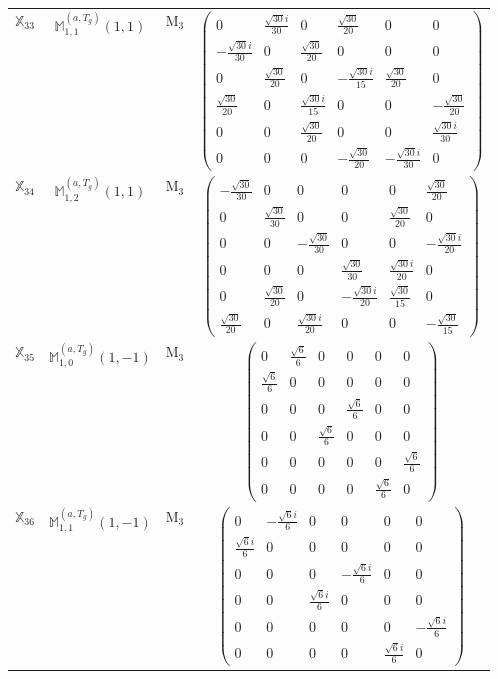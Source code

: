 \documentclass[fleqn,10pt,landscape]{article}
\begin{document}
\begin{itemize}
\begin{center}
\begin{longtable}{c|c|c|c}
$ \mathbb{X}_{33} $ & $\mathbb{M}_{1,1}^{(a,T_{g})}(1,1)$ & M$_{3}$ & $\begin{pmatrix} 0 & \frac{\sqrt{30} i}{30} & 0 & \frac{\sqrt{30}}{20} & 0 & 0 \\ - \frac{\sqrt{30} i}{30} & 0 & \frac{\sqrt{30}}{20} & 0 & 0 & 0 \\ 0 & \frac{\sqrt{30}}{20} & 0 & - \frac{\sqrt{30} i}{15} & \frac{\sqrt{30}}{20} & 0 \\ \frac{\sqrt{30}}{20} & 0 & \frac{\sqrt{30} i}{15} & 0 & 0 & - \frac{\sqrt{30}}{20} \\ 0 & 0 & \frac{\sqrt{30}}{20} & 0 & 0 & \frac{\sqrt{30} i}{30} \\ 0 & 0 & 0 & - \frac{\sqrt{30}}{20} & - \frac{\sqrt{30} i}{30} & 0 \end{pmatrix}$ \\
$ \mathbb{X}_{34} $ & $\mathbb{M}_{1,2}^{(a,T_{g})}(1,1)$ & M$_{3}$ & $\begin{pmatrix} - \frac{\sqrt{30}}{30} & 0 & 0 & 0 & 0 & \frac{\sqrt{30}}{20} \\ 0 & \frac{\sqrt{30}}{30} & 0 & 0 & \frac{\sqrt{30}}{20} & 0 \\ 0 & 0 & - \frac{\sqrt{30}}{30} & 0 & 0 & - \frac{\sqrt{30} i}{20} \\ 0 & 0 & 0 & \frac{\sqrt{30}}{30} & \frac{\sqrt{30} i}{20} & 0 \\ 0 & \frac{\sqrt{30}}{20} & 0 & - \frac{\sqrt{30} i}{20} & \frac{\sqrt{30}}{15} & 0 \\ \frac{\sqrt{30}}{20} & 0 & \frac{\sqrt{30} i}{20} & 0 & 0 & - \frac{\sqrt{30}}{15} \end{pmatrix}$ \\
$ \mathbb{X}_{35} $ & $\mathbb{M}_{1,0}^{(a,T_{g})}(1,-1)$ & M$_{3}$ & $\begin{pmatrix} 0 & \frac{\sqrt{6}}{6} & 0 & 0 & 0 & 0 \\ \frac{\sqrt{6}}{6} & 0 & 0 & 0 & 0 & 0 \\ 0 & 0 & 0 & \frac{\sqrt{6}}{6} & 0 & 0 \\ 0 & 0 & \frac{\sqrt{6}}{6} & 0 & 0 & 0 \\ 0 & 0 & 0 & 0 & 0 & \frac{\sqrt{6}}{6} \\ 0 & 0 & 0 & 0 & \frac{\sqrt{6}}{6} & 0 \end{pmatrix}$ \\
$ \mathbb{X}_{36} $ & $\mathbb{M}_{1,1}^{(a,T_{g})}(1,-1)$ & M$_{3}$ & $\begin{pmatrix} 0 & - \frac{\sqrt{6} i}{6} & 0 & 0 & 0 & 0 \\ \frac{\sqrt{6} i}{6} & 0 & 0 & 0 & 0 & 0 \\ 0 & 0 & 0 & - \frac{\sqrt{6} i}{6} & 0 & 0 \\ 0 & 0 & \frac{\sqrt{6} i}{6} & 0 & 0 & 0 \\ 0 & 0 & 0 & 0 & 0 & - \frac{\sqrt{6} i}{6} \\ 0 & 0 & 0 & 0 & \frac{\sqrt{6} i}{6} & 0 \end{pmatrix}$ \\

\end{longtable}
\end{center}
\end{itemize}
\end{document}
